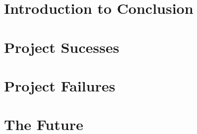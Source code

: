 \section {Introduction to Conclusion}


\section{Project Sucesses}

\section{Project Failures}

\section{The Future}
